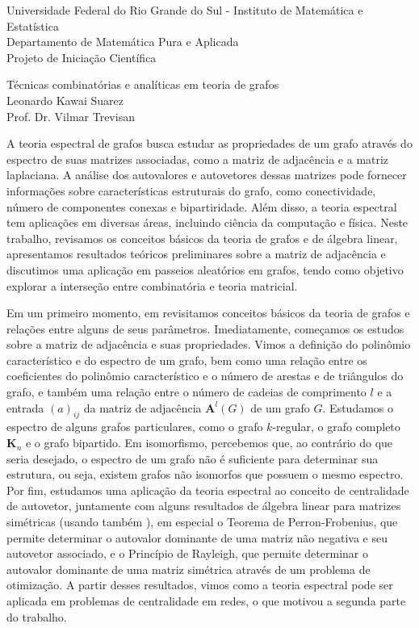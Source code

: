 \documentclass{article}
\begin{document}
\begin{flushleft}
    Universidade Federal do Rio Grande do Sul - Instituto de Matemática e Estatística \\
    Departamento de Matemática Pura e Aplicada \\
    Projeto de Iniciação Científica \\
\end{flushleft}

\vspace{0.1cm}

\begin{center}
    {\LARGE Técnicas combinatórias e analíticas em teoria de grafos} \\
    \vspace{0.4cm}
    {Leonardo Kawai Suarez} \\
    {Prof. Dr. Vilmar Trevisan}
\end{center}

A teoria espectral de grafos busca estudar as propriedades de um grafo através do espectro de suas matrizes associadas, como a matriz de adjacência e a matriz laplaciana. A análise dos autovalores e autovetores dessas matrizes pode fornecer informações sobre características estruturais do grafo, como conectividade, número de componentes conexas e bipartiridade. Além disso, a teoria espectral tem aplicações em diversas áreas, incluindo ciência da computação e física. Neste trabalho, revisamos os conceitos básicos da teoria de grafos e de álgebra linear, apresentamos resultados teóricos preliminares sobre a matriz de adjacência e discutimos uma aplicação em passeios aleatórios em grafos, tendo como objetivo explorar a interseção entre combinatória e teoria matricial.

Em um primeiro momento, em \cite{notas_col} revisitamos conceitos básicos da teoria de grafos e relações entre alguns de seus parâmetros. Imediatamente, começamos os estudos sobre a matriz de adjacência e suas propriedades. Vimos a definição do polinômio característico e do espectro de um grafo, bem como uma relação entre os coeficientes do polinômio característico e o número de arestas e de triângulos do grafo, e também uma relação entre o número de cadeias de comprimento \(l\) e a entrada \((a)_{ij}\) da matriz de adjacência \(\mathbf{A}^l(G)\) de um grafo \(G\). Estudamos o espectro de alguns grafos particulares, como o grafo \(k\)-regular, o grafo completo \(\mathbf{K}_n\) e o grafo bipartido. Em isomorfismo, percebemos que, ao contrário do que seria desejado, o espectro de um grafo não é suficiente para determinar sua estrutura, ou seja, existem grafos não isomorfos que possuem o mesmo espectro. Por fim, estudamos uma aplicação da teoria espectral ao conceito de centralidade de autovetor, juntamente com alguns resultados de álgebra linear para matrizes simétricas (usando também \cite{meyer}), em especial o Teorema de Perron-Frobenius, que permite determinar o autovalor dominante de uma matriz não negativa e seu autovetor associado, e o Princípio de Rayleigh, que permite determinar o autovalor dominante de uma matriz simétrica através de um problema de otimização. A partir desses resultados, vimos como a teoria espectral pode ser aplicada em problemas de centralidade em redes, o que motivou a segunda parte do trabalho.
\end{document}

